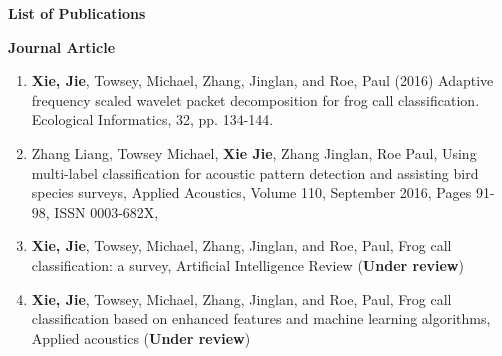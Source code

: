 \newpage
\begin{center}
{\huge \textbf{List of Publications}}
\end{center}

{ \large \textbf{Journal Article}}
\begin{enumerate} 
\item	\textbf{Xie, Jie}, Towsey, Michael, Zhang, Jinglan, and Roe, Paul (2016) Adaptive frequency scaled wavelet packet decomposition for frog call classification.  Ecological Informatics, 32, pp. 134-144.
\item	Zhang Liang, Towsey Michael, \textbf{Xie Jie}, Zhang Jinglan, Roe Paul,  Using multi-label classification for acoustic pattern detection and assisting bird species surveys, Applied Acoustics, Volume 110, September 2016, Pages 91-98, ISSN 0003-682X,
\item \textbf{Xie, Jie}, Towsey, Michael, Zhang, Jinglan, and Roe, Paul, Frog call classification: a survey, Artificial Intelligence Review (\textbf{Under review})

\item  \textbf{Xie, Jie}, Towsey, Michael, Zhang, Jinglan, and Roe, Paul, Frog call classification based on enhanced features and machine learning algorithms, Applied acoustics (\textbf{Under review})


\end{enumerate}

